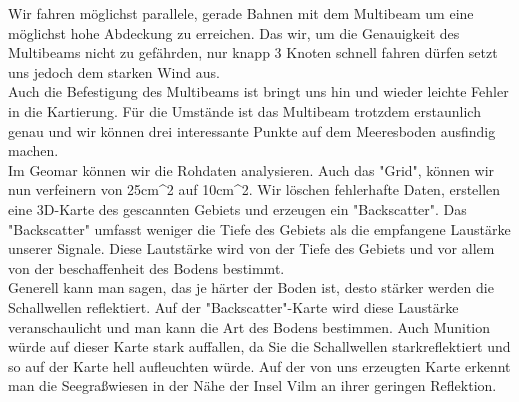 Wir fahren möglichst parallele, gerade Bahnen mit dem Multibeam um eine möglichst hohe Abdeckung zu erreichen. 
Das wir, um die Genauigkeit des Multibeams nicht zu gefährden, nur knapp 3 Knoten schnell fahren dürfen setzt
uns jedoch dem starken Wind aus. \\

Auch die Befestigung des Multibeams ist bringt uns hin und wieder leichte Fehler in die Kartierung. Für die 
Umstände ist das Multibeam trotzdem erstaunlich genau und wir können drei interessante Punkte auf dem 
Meeresboden ausfindig machen. \\

Im Geomar können wir die Rohdaten analysieren. Auch das "Grid", können wir nun verfeinern von 25cm^2 auf 10cm^2. 
Wir löschen fehlerhafte Daten, erstellen eine 3D-Karte des gescannten Gebiets und erzeugen ein "Backscatter". 
Das "Backscatter" umfasst weniger die Tiefe des Gebiets als die empfangene Laustärke unserer Signale. 
Diese Lautstärke wird von der Tiefe des Gebiets und vor allem von der beschaffenheit des Bodens bestimmt. \\

Generell kann man sagen, das je härter der Boden ist, desto stärker werden die Schallwellen reflektiert. 
Auf der "Backscatter"-Karte wird diese Laustärke veranschaulicht und man kann die Art des Bodens bestimmen.
Auch Munition würde auf dieser Karte stark auffallen, da Sie die Schallwellen starkreflektiert und so 
auf der Karte hell aufleuchten würde. Auf der von uns erzeugten Karte erkennt man die Seegraßwiesen in 
der Nähe der Insel Vilm an ihrer geringen Reflektion.
